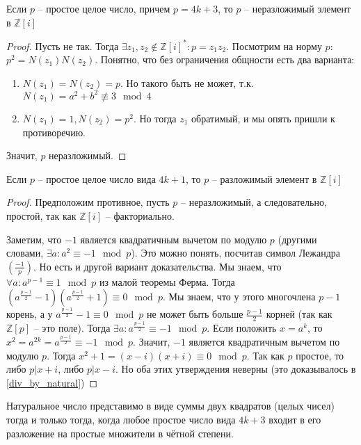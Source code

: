 \documentclass{article}
\begin{document}
\begin{statement}
    Если $p$ -- простое целое число, причем $p = 4k + 3$, то $p$ -- неразложимый элемент в $\mathbb{Z}[i]$
\end{statement}

\begin{proof}
    Пусть не так. Тогда $\exists z_1, z_2 \not \in \mathbb{Z}[i]^*: p = z_1 z_2$. Посмотрим на норму $p$: $p^2 = N(z_1)
    N(z_2)$. Понятно, что без ограничения общности есть два варианта:
    \begin{enumerate}
        \item $N(z_1) = N(z_2) = p$. Но такого быть не может, т.к. $N(z_1) = a^2 + b^2 \not \equiv 3 \mod 4$
        \item $N(z_1) = 1, N(z_2) = p^2$. Но тогда $z_1$ обратимый, и мы опять пришли к противоречию.
    \end{enumerate}
    Значит, $p$ неразложимый.
\end{proof}

\begin{statement}
    Если $p$ -- простое целое число вида $4k + 1$, то $p$ -- разложимый элемент в $\mathbb{Z}[i]$
\end{statement}

\begin{proof}
    Предположим противное, пусть $p$ -- неразложимый, а следовательно, простой, так как $\mathbb{Z}[i]$ -- факториально.

    Заметим, что $-1$ является квадратичным вычетом по модулю $p$ (другими словами, $\exists a: a^2 \equiv -1 \mod p$).
    Это можно понять, посчитав символ Лежандра $\left(\frac{-1}{p}\right)$. Но есть и другой вариант доказательства. Мы
    знаем, что $\forall a: a^{p - 1} \equiv 1 \mod p$ из малой теоремы Ферма. Тогда $(a^{\frac{p - 1}{2}} - 1)
    (a^{\frac{p - 1}{2}} + 1) \equiv 0 \mod p$. Мы знаем, что у этого многочлена $p - 1$ корень, а у
    $a^{\frac{p - 1}{2}} - 1 \equiv 0 \mod p$ не может быть больше $\frac{p - 1}{2}$ корней (так как $\mathbb{Z}[p]$ --
    это поле). Тогда $\exists a: a^{\frac{p - 1}{2}} \equiv -1 \mod p$. Если положить $x = a^{k}$, то $x^2 =
    a^{2k} = a^{\frac{p - 1}{2}} \equiv -1 \mod p$. Значит, $-1$ является квадратичным вычетом по модулю $p$. Тогда $x^2
    + 1 = (x - i)(x + i) \equiv 0 \mod p$. Так как $p$ простое, то либо $p | x + i$, либо $p | x - i$. Но оба этих
    утверждения неверны (это доказывалось в \ref{div_by_natural})
\end{proof}

\begin{statement}
    Натуральное число представимо в виде суммы двух квадратов (целых чисел) тогда и только тогда, когда
    любое простое число вида $4k + 3$ входит в его разложение на простые множители в чётной степени.
\end{statement}
\end{document}

